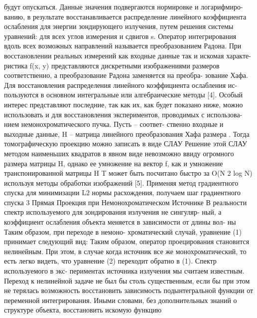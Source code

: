 будут опускаться. Данные значения подвергаются нормировке и логарифмиро-
ванию, в результате восстанавливается распределение линейного коэффициента
ослабления для энергии зондирующего излучения, путем решения системы
уравнений:
для всех углов измерения %
 и сдвигов s. Оператор интегрирования вдоль всех
возможных направлений называется преобразованием Радона. При восстановлении реальных измерений как входные данные%
так и искомая характе-
ристика f(x, y) представляются дискретными изображениями размеров 
соответственно, а преобразование Радона заменяется на преобра-
зование Хафа.
Для восстановления распределения линейного коэффициента ослабления ис-
пользуются в основном интегральные или алгебраические методы [4]. Особый
интерес представляют последние, так как их, как будет показано ниже, можно
использовать и для восстановления экспериментов, проводимых с использова-
нием немонохроматического пучка. Пусть 
– соответ-
ственно входные и выходные данные, H – матрица линейного преобразования
Хафа размера 
 . Тогда томографическую проекцию можно записать
в виде СЛАУ
Решение этой СЛАУ методом наименьших квадратов в явном виде невозможно
ввиду огромного размера матрицы H, однако ее умножение на вектор f, как и
умножение транспонированной матрицы H T может быть посчитано быстро за
O(N 2 log N) используя методы обработки изображений [5]. Применяя метод
градиентного спуска для минимизации L2 нормы расхождения, получаем шаг
градиентного спуска
3
Прямая Проекция при Немонохроматическом Источнике
В реальности спектр используемого для зондирования излучения не сингуляр-
ный, а коэффициент ослабления объекта меняется в зависимости от длины вол-
ны 
 Таким образом, при переходе в немоно-
хроматический случай, уравнение (1) принимает следующий вид:
Таким образом, оператор проецирования становится нелинейным. При этом, в
случае когда источник все же монохроматический, то есть
 легко
видеть, что уравнение (2) переходит обратно в (1). Спектр используемого в экс-
периментах источника излучения мы считаем известным.
Переход к нелинейной задаче не был бы столь существенным, если бы при этом
не терялась возможность восстановить зависимость подынтегральной функции
от переменной интегрирования. Иными словами, без дополнительных знаний о
структуре объекта, восстановить искомую функцию
